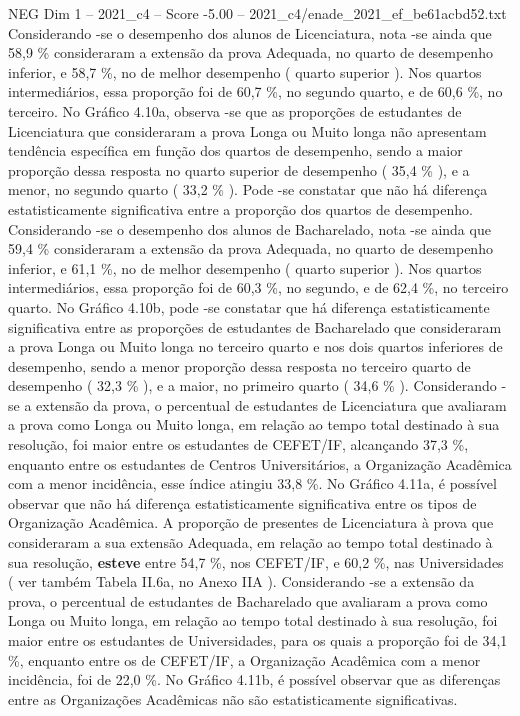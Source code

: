 \begin{textsample}{NEG Dim 1 – 2021\_c4 – Score -5.00 – 2021\_c4/enade\_2021\_ef\_be61acbd52.txt}
Considerando -se o desempenho dos alunos de Licenciatura, nota -se ainda que 58,9 \% consideraram a extensão da prova Adequada, no quarto de desempenho inferior, e 58,7 \%, no de melhor desempenho ( quarto superior ).
Nos quartos intermediários, essa proporção foi de 60,7 \%, no segundo quarto, e de 60,6 \%, no terceiro.
No Gráfico 4.10a, observa -se que as proporções de estudantes de Licenciatura que consideraram a prova Longa ou Muito longa não apresentam tendência específica em função dos quartos de desempenho, sendo a maior proporção dessa resposta no quarto superior de desempenho ( 35,4 \% ), e a menor, no segundo quarto ( 33,2 \% ).
Pode -se constatar que não há diferença estatisticamente significativa entre a proporção dos quartos de desempenho.
Considerando -se o desempenho dos alunos de Bacharelado, nota -se ainda que 59,4 \% consideraram a extensão da prova Adequada, no quarto de desempenho inferior, e 61,1 \%, no de melhor desempenho ( quarto superior ).
Nos quartos intermediários, essa proporção foi de 60,3 \%, no segundo, e de 62,4 \%, no terceiro quarto.
No Gráfico 4.10b, pode -se constatar que há diferença estatisticamente significativa entre as proporções de estudantes de Bacharelado que consideraram a prova Longa ou Muito longa no terceiro quarto e nos dois quartos inferiores de desempenho, sendo a menor proporção dessa resposta no terceiro quarto de desempenho ( 32,3 \% ), e a maior, no primeiro quarto ( 34,6 \% ).
Considerando -se a extensão da prova, o percentual de estudantes de Licenciatura que avaliaram a prova como Longa ou Muito longa, em relação ao tempo total destinado à sua resolução, foi maior entre os estudantes de CEFET/IF, alcançando 37,3 \%, enquanto entre os estudantes de Centros Universitários, a Organização Acadêmica com a menor incidência, esse índice atingiu 33,8 \%.
No Gráfico 4.11a, é possível observar que não há diferença estatisticamente significativa entre os tipos de Organização Acadêmica.
A proporção de presentes de Licenciatura à prova que consideraram a sua extensão Adequada, em relação ao tempo total destinado à sua resolução, \textbf{esteve} entre 54,7 \%, nos CEFET/IF, e 60,2 \%, nas Universidades ( ver também Tabela II.6a, no Anexo IIA ).
Considerando -se a extensão da prova, o percentual de estudantes de Bacharelado que avaliaram a prova como Longa ou Muito longa, em relação ao tempo total destinado à sua resolução, foi maior entre os estudantes de Universidades, para os quais a proporção foi de 34,1 \%, enquanto entre os de CEFET/IF, a Organização Acadêmica com a menor incidência, foi de 22,0 \%.
No Gráfico 4.11b, é possível observar que as diferenças entre as Organizações Acadêmicas não são estatisticamente significativas.

\end{textsample}
